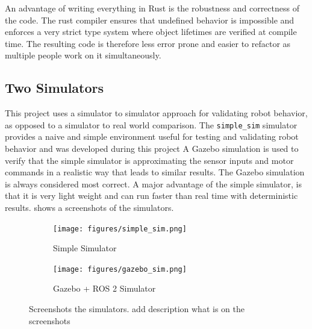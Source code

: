 An advantage of writing everything in Rust is the robustness and correctness of the code. The rust compiler ensures that undefined behavior is impossible and enforces a very strict type system where object lifetimes are verified at compile time. The resulting code is therefore less error prone and easier to refactor as multiple people work on it simultaneously.

\subsection{Two Simulators}
This project uses a simulator to simulator approach for validating robot behavior, as opposed to a simulator to real world comparison. The \texttt{simple\_sim} simulator provides a naive and simple environment useful for testing and validating robot behavior and was developed during this project A Gazebo simulation is used to verify that the simple simulator is approximating the sensor inputs and motor commands in a realistic way that leads to similar results. The Gazebo simulation is always considered most correct. A major advantage of the simple simulator, is that it is very light weight and can run faster than real time with deterministic results.  shows a screenshots of the simulators.

\begin{figure}[h]
    \centering
    \begin{subfigure}[b]{0.45\textwidth}
        \centering
        \texttt{[image: figures/simple\_sim.png]}
        \caption{Simple Simulator}
    \end{subfigure}
    \hfill
    \begin{subfigure}[b]{0.45\textwidth}
        \centering
        \texttt{[image: figures/gazebo\_sim.png]}
        \caption{Gazebo + ROS 2 Simulator}
    \end{subfigure}
    \caption{Screenshots the simulators. {\color{red} add description what is on the screenshots}}
    \label{fig:simulators}
\end{figure}
